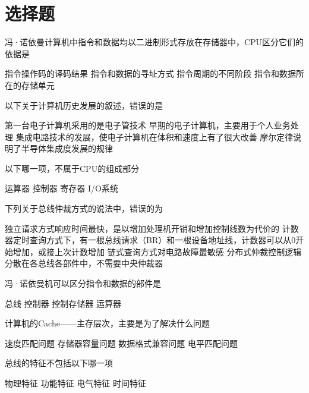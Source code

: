 \documentclass{exam}
\newif\ifprint
\newcommand{\blank}[2][1cm]{\uline{\makebox[#1][c]{%
			\ifprint
			\phantom{#2}%
			\else
			#2%
			\fi}}}
\begin{document}
\section{选择题}
\begin{questions}
	\question 冯·诺依曼计算机中指令和数据均以二进制形式存放在存储器中，CPU区分它们的依据是\blank{}
	\begin{choices}
		\choice 指令操作码的译码结果
		\choice 指令和数据的寻址方式
		\choice 指令周期的不同阶段
		\choice 指令和数据所在的存储单元
	\end{choices}

	\question 以下关于计算机历史发展的叙述，错误的是\blank{}
	\begin{choices}
		\choice 第一台电子计算机采用的是电子管技术
		\choice 早期的电子计算机，主要用于个人业务处理
		\choice 集成电路技术的发展，使电子计算机在体积和速度上有了很大改善
		\choice 摩尔定律说明了半导体集成度发展的规律
	\end{choices}

	\question 以下哪一项，不属于CPU的组成部分\blank{}
	\begin{choices}
		\choice 运算器
		\choice 控制器
		\choice 寄存器
		\choice I/O系统
	\end{choices}

	\question 下列关于总线仲裁方式的说法中，错误的为\blank{}
	\begin{choices}
		\choice 独立请求方式响应时间最快，是以增加处理机开销和增加控制线数为代价的
		\choice 计数器定时查询方式下，有一根总线请求（BR）和一根设备地址线，计数器可以从0开始增加，或接上次计数增加
		\choice 链式查询方式对电路故障最敏感
		\choice 分布式仲裁控制逻辑分散在各总线各部件中，不需要中央仲裁器
	\end{choices}

	\question 冯·诺依曼机可以区分指令和数据的部件是\blank{}
	\begin{choices}
		\choice 总线
		\choice 控制器
		\choice 控制存储器
		\choice 运算器
	\end{choices}

	\question 计算机的Cache——主存层次，主要是为了解决什么问题\blank{}
	\begin{choices}
		\choice 速度匹配问题
		\choice 存储器容量问题
		\choice 数据格式兼容问题
		\choice 电平匹配问题
	\end{choices}

	\question 总线的特征不包括以下哪一项\blank{}
	\begin{choices}
		\choice 物理特征
		\choice 功能特征
		\choice 电气特征
		\choice 时间特征
	\end{choices}


\end{questions}
\end{document}
